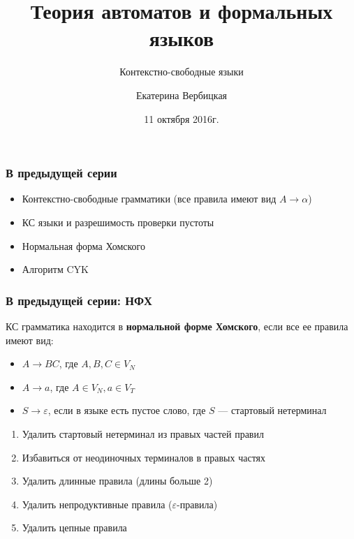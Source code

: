 \documentclass{beamer}
\title[]{Теория автоматов и формальных языков}
\subtitle[]{Контекстно-свободные языки}
\institute[]{
Санкт-Петербургский государственный электротехнический университет <<ЛЭТИ>>\\
}
\author[]{Екатерина Вербицкая}
\date{11 октября 2016г.}
\begin{document}
{
  \begin{frame}
    \titlepage
  \end{frame}
}


\begin{frame}[fragile]
  \transwipe[direction=90]
  \frametitle{В предыдущей серии}
  \begin{itemize}
    \item Контекстно-свободные грамматики (все правила имеют вид $A \rightarrow \alpha$) 
    \item КС языки и разрешимость проверки пустоты
    \item Нормальная форма Хомского
    \item Алгоритм CYK
  \end{itemize}
\end{frame}

\begin{frame}[fragile]
  \transwipe[direction=90]
  \frametitle{В предыдущей серии: НФХ}
  КС грамматика находится в \textbf{нормальной форме Хомского}, если все ее правила имеют вид: 
  \begin{itemize}
    \item $A \rightarrow B C$, где $A,B,C \in V_N$
    \item $A \rightarrow a$, где $A \in V_N, a \in V_T$
    \item $S \rightarrow \varepsilon$, если в языке есть пустое слово, где $S$ --- стартовый нетерминал
  \end{itemize}

  \begin{enumerate}
    \item Удалить стартовый нетерминал из правых частей правил 
    \item Избавиться от неодиночных терминалов в правых частях 
    \item Удалить длинные правила (длины больше 2)
    \item Удалить непродуктивные правила ($\varepsilon$-правила)
    \item Удалить цепные правила
   \end{enumerate}
\end{frame}
\end{document}
